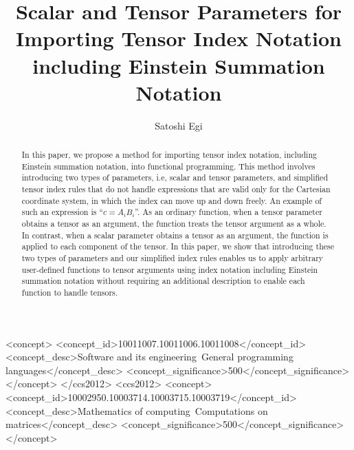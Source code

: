 \documentclass[acmlarge]{acmart}
\begin{document}
\setlength{\pdfpageheight}{\paperheight}
\setlength{\pdfpagewidth}{\paperwidth}

\title[Paper: Scalar and Tensor Parameters for Importing Tensor Index Notation ...]{Scalar and Tensor Parameters for Importing Tensor Index Notation including Einstein Summation Notation}

\author{Satoshi Egi}

\begin{abstract}
In this paper, we propose a method for importing tensor index notation, including Einstein summation notation, into functional programming.
This method involves introducing two types of parameters, i.e, scalar and tensor parameters, and simplified tensor index rules that do not handle expressions that are valid only for the Cartesian coordinate system, in which the index can move up and down freely.
An example of such an expression is ``$c = A_i B_i$''.
As an ordinary function, when a tensor parameter obtains a tensor as an argument, the function treats the tensor argument as a whole.
In contrast, when a scalar parameter obtains a tensor as an argument, the function is applied to each component of the tensor.
In this paper, we show that introducing these two types of parameters and our simplified index rules enables us to apply arbitrary user-defined functions to tensor arguments using index notation including Einstein summation notation without requiring an additional description to enable each function to handle tensors.
\end{abstract}

\begin{CCSXML}
<concept>
<concept_id>10011007.10011006.10011008</concept_id>
<concept_desc>Software and its engineering~General programming languages</concept_desc>
<concept_significance>500</concept_significance>
</concept>
</ccs2012>
<ccs2012>
<concept>
<concept_id>10002950.10003714.10003715.10003719</concept_id>
<concept_desc>Mathematics of computing~Computations on matrices</concept_desc>
<concept_significance>500</concept_significance>
</concept>
\end{CCSXML}

\end{document}
